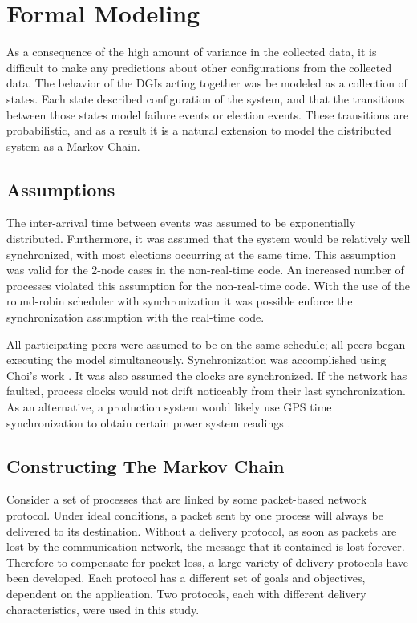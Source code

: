 \section{Formal Modeling}

As a consequence of the high amount of variance in the collected data, it is difficult to make any predictions about other configurations from the collected data.
The behavior of the DGIs acting together was be modeled as a collection of states.
Each state described configuration of the system, and that the transitions between those states model failure events or election events.
These transitions are probabilistic, and as a result it is a natural extension to model the distributed system as a Markov Chain.

\subsection{Assumptions}
The inter-arrival time between events was assumed to be exponentially distributed.
Furthermore, it was assumed that the system would be relatively well synchronized, with most elections occurring at the same time.
This assumption was valid for the 2-node cases in the non-real-time code. 
An increased number of processes violated this assumption for the non-real-time code.
With the use of the round-robin scheduler with synchronization it was possible enforce the synchronization assumption with the real-time code.

All participating peers were assumed to be on the same schedule; all peers began executing the model simultaneously.
Synchronization was accomplished using Choi's work \cite{DCS}.
It was also assumed the clocks are synchronized. 
If the network has faulted, process clocks would not drift noticeably from their last synchronization.
As an alternative, a production system would likely use GPS time synchronization to obtain certain power system readings \cite{PHASORREADINGS}.

\subsection{Constructing The Markov Chain}

Consider a set of processes that are linked by some packet-based network protocol.
Under ideal conditions, a packet sent by one process  will always be delivered to its destination.
Without a delivery protocol, as soon as packets are lost by the communication network, the message that it contained is lost forever.
Therefore to compensate for packet loss, a large variety of delivery protocols have been developed.
Each protocol has a different set of goals and objectives, dependent on the application.
Two protocols, each with different delivery characteristics, were used in this study.

